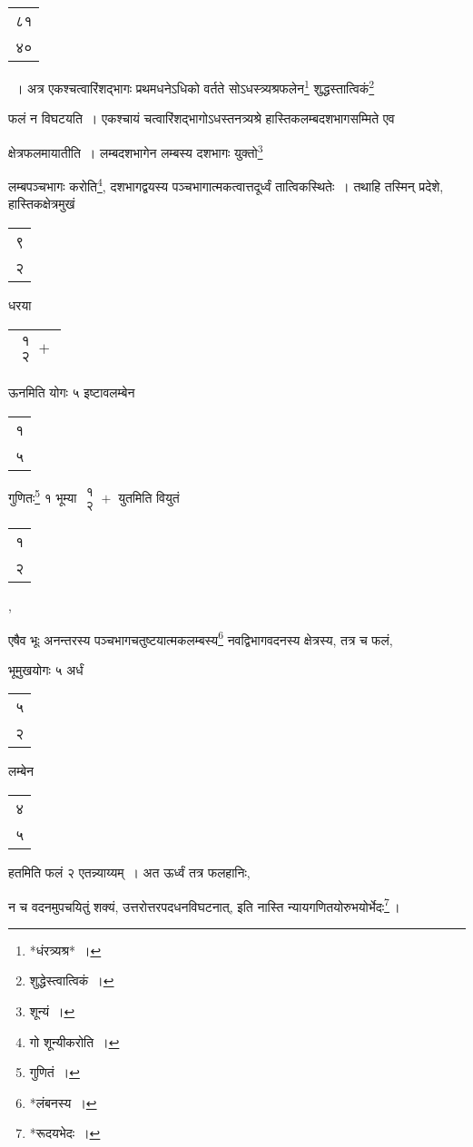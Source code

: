 \documentclass[10pt, openany]{book}
\begin{document}
{{{\begin{tabular}{|c|} ८१ \\४०\\\hline  \end{tabular}~। अत्र एकश्चत्वारिंशद्भागः प्रथमधनेऽधिको वर्तते
सोऽधस्त्र्यश्रफलेन\renewcommand{\thefootnote}{११}\footnote{*धंरत्र्यश्र*~।} शुद्धस्तात्विकं\renewcommand{\thefootnote}{१२}\footnote{शुद्धेस्त्वात्विकं~।}}
{फलं न विघटयति~। एकश्चायं चत्वारिंशद्भागोऽधस्तनत्र्यश्रे
हास्तिकलम्बदशभागसम्मिते एव}
{क्षेत्रफलमायातीति~। लम्बदशभागेन लम्बस्य दशभागः युक्तो\renewcommand{\thefootnote}{१३}\footnote{शून्यं~।}
{लम्बपञ्चभागः करोति\renewcommand{\thefootnote}{१४}\footnote{गो शून्यीकरोति~।}, दशभागद्वयस्य पञ्चभागात्मकत्वात्तदूर्ध्वं तात्विकस्थितेः~। तथाहि तस्मिन्
प्रदेशे, हास्तिकक्षेत्रमुखं \begin{tabular}{|c|} ९ \\२\\\hline \end{tabular}}
{धरया  \begin{tabular}{|c|}$\begin{matrix}
\mbox{{१}}\\
\mbox{{२}}
\end{matrix}+$\\\hline \end{tabular} ऊनमिति योगः ५ इष्टावलम्बेन \begin{tabular}{|c|}१\\ ५\\\hline \end{tabular} गुणितः\renewcommand{\thefootnote}{१५}\footnote{गुणितं~।} १ भूम्या $\begin{matrix}
\mbox{{१}}\\
\mbox{{२}}
\end{matrix}+$
युतमिति वियुतं\begin{tabular}{c}१\\ २\end{tabular},}
{एषैव भूः अनन्तरस्य पञ्चभागचतुष्टयात्मकलम्बस्य\renewcommand{\thefootnote}{१६}\footnote{*लंबनस्य~।} नवद्विभागवदनस्य
क्षेत्रस्य, तत्र च फलं,}
{भूमुखयोगः ५ अर्धं\begin{tabular}{c}५\\ २\end{tabular}लम्बेन\begin{tabular}{c}४\\ ५\end{tabular}हतमिति फलं २ एतन्न्याय्यम्~। अत
ऊर्ध्वं तत्र फलहानिः,}
{न च वदनमुपचयितुं शक्यं, उत्तरोत्तरपदधनविघटनात्, इति नास्ति
न्यायगणितयोरुभयोर्भेदः\renewcommand{\thefootnote}{१७}\footnote{*रूदयभेदः~।}\,।}
\vspace{3mm}

}}}
\end{document}
